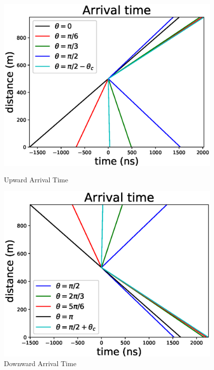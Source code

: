 \begin{figure}[ht]
  \begin{minipage}[b]{0.48\linewidth}
    \centering
    \includegraphics[width=\textwidth]{./Figures/upward_arrival_time.eps}
    \caption{Upward Arrival Time}
    \label{subfig:utime}
  \end{minipage}
  \hspace{0.1cm}
  \begin{minipage}[b]{0.48\linewidth}
    \centering
    \includegraphics[width=\textwidth]{./Figures/downward_arrival_time.eps}
    \caption{Downward Arrival Time}
    \label{subfig:dtime}
  \end{minipage}
\end{figure}


